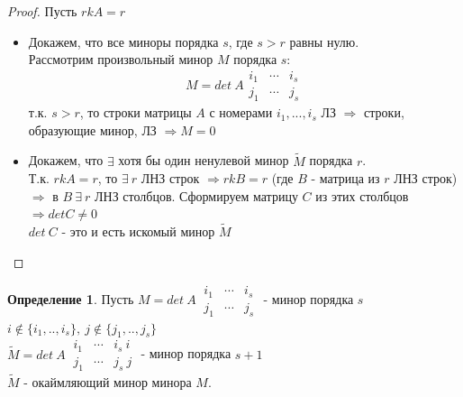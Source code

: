 \documentclass[a4paper, 12pt]{article}
\theoremstyle{definition}
\newtheorem*{definition}{Определение}
\begin{document}
  \begin{proof}
    Пусть $rkA = r$ 
    \begin{itemize}
      \item Докажем, что все миноры порядка $s$, где $s>r$ равны нулю. \\
      Рассмотрим произвольный минор $M$ порядка $s$: $$M = det \ A \begin{matrix}
        i_1 & \cdots & i_s \\
        j_1 & \cdots & j_s
      \end{matrix}$$ 
      т.к. $s>r$, то строки матрицы $A$ с номерами $i_1,...,i_s$ ЛЗ $\Longrightarrow $ строки, образующие минор, ЛЗ $\Longrightarrow M=0$ 
      \item Докажем, что $\exists$ хотя бы один ненулевой минор $\widetilde{M}$ порядка $r$. \\
      Т.к. $rkA = r$, то $\exists \ r$ ЛНЗ строк $\Longrightarrow rkB = r $ (где $B$  - матрица из $r$  ЛНЗ строк) $ \Longrightarrow $ в $B \ \exists \ r $ ЛНЗ столбцов. Сформируем матрицу $C$ из этих столбцов $\Longrightarrow detC \not = 0$ \\
      $det \ C$ - это и есть искомый минор $\widetilde{M}$     
    \end{itemize}
  \end{proof} 
  \begin{definition}
     Пусть $M = det \ A \ \begin{matrix}
      i_1 & \cdots & i_s \\
      j_1 & \cdots & j_s
    \end{matrix}$ - минор порядка $s$ \\
    $i \not \in \{i_1,..,i_s\}, \ j \not \in \{j_1,..,j_s\}$ \vspace{0.3cm}\\
    $\widetilde{M} = det\ A \ \begin{matrix}
      i_1 & \cdots & i_s \ i \\
      j_1 & \cdots & j_s \ j
    \end{matrix}$ - минор порядка  $s+1$ \\
    $\widetilde{M}$ - окаймляющий минор минора $M$.  
  \end{definition} 
\end{document}
